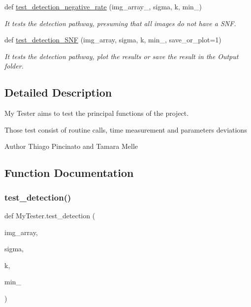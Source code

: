 \begin{DoxyCompactItemize}
def \hyperlink{namespaceMyTester_a0eb2b65bdc144e87a44a4da58d38cba7}{test\+\_\+detection\+\_\+negative\+\_\+rate} (img\+\_\+array\+\_\+, sigma, k, min\+\_\+)
\begin{DoxyCompactList}\small\item\em It tests the detection pathway, presuming that all images do not have a S\+NF. \end{DoxyCompactList}\item 
def \hyperlink{namespaceMyTester_a987df9a91b15345e3a3ed238d19c894f}{test\+\_\+detection\+\_\+\+S\+NF} (img\+\_\+array, sigma, k, min\+\_\+, save\+\_\+or\+\_\+plot=1)
\begin{DoxyCompactList}\small\item\em It tests the detection pathway, plot the results or save the result in the Output folder. \end{DoxyCompactList}\end{DoxyCompactItemize}


\subsection{Detailed Description}
My Tester aims to test the principal functions of the project. 

Those test consist of routine calls, time measurement and parameters deviations \begin{DoxyAuthor}{Author}
Thiago Pincinato and Tamara Melle 
\end{DoxyAuthor}


\subsection{Function Documentation}
\mbox{\label{namespaceMyTester_ad56fe3114535af39d7584621f94deda5}} 
\subsubsection{\texorpdfstring{test\+\_\+detection()}{test\_detection()}}
{\footnotesize\ttfamily def My\+Tester.\+test\+\_\+detection (\begin{DoxyParamCaption}\item[{}]{img\+\_\+array,  }\item[{}]{sigma,  }\item[{}]{k,  }\item[{}]{min\+\_\+ }\end{DoxyParamCaption})}



